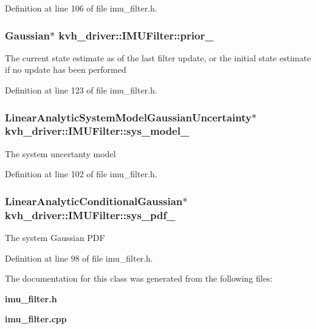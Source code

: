\-Definition at line 106 of file imu\-\_\-filter.\-h.

\subsubsection[{prior\-\_\-}]{\setlength{\rightskip}{0pt plus 5cm}\-Gaussian$\ast$ {\bf kvh\-\_\-driver\-::\-I\-M\-U\-Filter\-::prior\-\_\-}\hspace{0.3cm}{\ttfamily  [private]}}\label{classkvh__driver_1_1IMUFilter_a86d7af469718ba5c84744efc0518b945}
\-The current state estimate as of the last filter update, or the initial state estimate if no update has been performed 

\-Definition at line 123 of file imu\-\_\-filter.\-h.

\subsubsection[{sys\-\_\-model\-\_\-}]{\setlength{\rightskip}{0pt plus 5cm}\-Linear\-Analytic\-System\-Model\-Gaussian\-Uncertainty$\ast$ {\bf kvh\-\_\-driver\-::\-I\-M\-U\-Filter\-::sys\-\_\-model\-\_\-}\hspace{0.3cm}{\ttfamily  [private]}}\label{classkvh__driver_1_1IMUFilter_a86cee9be8d1bb33032b0e9cf4d039e0b}
\-The system uncertanty model 

\-Definition at line 102 of file imu\-\_\-filter.\-h.

\subsubsection[{sys\-\_\-pdf\-\_\-}]{\setlength{\rightskip}{0pt plus 5cm}\-Linear\-Analytic\-Conditional\-Gaussian$\ast$ {\bf kvh\-\_\-driver\-::\-I\-M\-U\-Filter\-::sys\-\_\-pdf\-\_\-}\hspace{0.3cm}{\ttfamily  [private]}}\label{classkvh__driver_1_1IMUFilter_a3f96ad360e36d278fb482dfc03cf0266}
\-The system \-Gaussian \-P\-D\-F 

\-Definition at line 98 of file imu\-\_\-filter.\-h.



\-The documentation for this class was generated from the following files\-:\begin{DoxyCompactItemize}
\item 
{\bf imu\-\_\-filter.\-h}\item 
{\bf imu\-\_\-filter.\-cpp}\end{DoxyCompactItemize}
